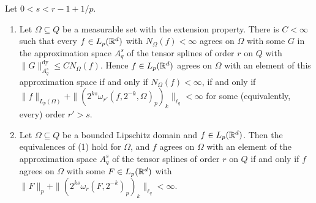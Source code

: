 \begin{theorem}
\label{thm:domain-splines}
\leanok
{}
Let $0 < s < r - 1 + 1/p$.
\begin{enumerate}
  \item Let $\Omega \subseteq Q$ be a measurable set with the extension property. There is
    $C < \infty$ such that every $f \in L_p(\mathbb{R}^d)$ with $N_\Omega(f) < \infty$ agrees on
    $\Omega$ with some $G$ in the approximation space $A^s_q$ of the tensor splines of order $r$
    on $Q$ with $\|G\|^{\mathrm{dy}}_{A^s_q} \leq C N_\Omega(f)$. Hence $f \in L_p(\mathbb{R}^d)$
    agrees on $\Omega$ with an element of this approximation space if and only if
    $N_\Omega(f) < \infty$, if and only if
    $\|f\|_{L_p(\Omega)} + \|(2^{ks} \omega_{r'}(f, 2^{-k}, \Omega)_p)_k\|_{\ell_q} < \infty$
    for some (equivalently, every) order $r' > s$.
  \item Let $\Omega \subseteq Q$ be a bounded Lipschitz domain and $f \in L_p(\mathbb{R}^d)$. Then the
    equivalences of (1) hold for $\Omega$, and $f$ agrees on $\Omega$ with an element of the
    approximation space $A^s_q$ of the tensor splines of order $r$ on $Q$ if and only if $f$
    agrees on $\Omega$ with some $F \in L_p(\mathbb{R}^d)$ with
    $\|F\|_p + \|(2^{ks} \omega_r(F, 2^{-k})_p)_k\|_{\ell_q} < \infty$.
\end{enumerate}
\end{theorem}

